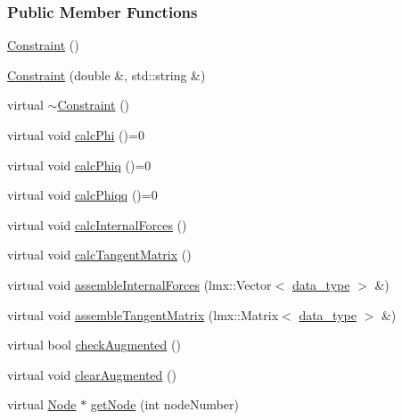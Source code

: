 \subsubsection*{Public Member Functions}
\begin{DoxyCompactItemize}
\item 
\hyperlink{classmknix_1_1_constraint_ae4a69ed64d7746a7f8e2d23f04bc6de6}{Constraint} ()
\item 
\hyperlink{classmknix_1_1_constraint_a093b4ffce363485f60ba251356ff88d1}{Constraint} (double \&, std\-::string \&)
\item 
virtual \hyperlink{classmknix_1_1_constraint_a84cbe5af8074dc229f583d119bbde3e1}{$\sim$\-Constraint} ()
\item 
virtual void \hyperlink{classmknix_1_1_constraint_a7f2b34d256d5eec54b34b0440b562ec1}{calc\-Phi} ()=0
\item 
virtual void \hyperlink{classmknix_1_1_constraint_ab129143960df2b9459e274275608bcf2}{calc\-Phiq} ()=0
\item 
virtual void \hyperlink{classmknix_1_1_constraint_a73ff21573b5e9c4acda789bd5ac46ea8}{calc\-Phiqq} ()=0
\item 
virtual void \hyperlink{classmknix_1_1_constraint_a00ea21a19168bc3cfd3ba97c6a2be31d}{calc\-Internal\-Forces} ()
\item 
virtual void \hyperlink{classmknix_1_1_constraint_a9b7594c65aa792ffb56d3a598996a969}{calc\-Tangent\-Matrix} ()
\item 
virtual void \hyperlink{classmknix_1_1_constraint_aca5d35f6ecd8f8f3852c150c7901b890}{assemble\-Internal\-Forces} (lmx\-::\-Vector$<$ \hyperlink{namespacemknix_a16be4b246fbf2cceb141e3a179111020}{data\-\_\-type} $>$ \&)
\item 
virtual void \hyperlink{classmknix_1_1_constraint_ac376643d6d73cb3b591ba80aae9f7166}{assemble\-Tangent\-Matrix} (lmx\-::\-Matrix$<$ \hyperlink{namespacemknix_a16be4b246fbf2cceb141e3a179111020}{data\-\_\-type} $>$ \&)
\item 
virtual bool \hyperlink{classmknix_1_1_constraint_a26923b449734b9f11ed5ca2556585dcb}{check\-Augmented} ()
\item 
virtual void \hyperlink{classmknix_1_1_constraint_a2e1f0de7e983151fb892468774dcdf12}{clear\-Augmented} ()
\item 
virtual \hyperlink{classmknix_1_1_node}{Node} $\ast$ \hyperlink{classmknix_1_1_constraint_a0e81d924dad26b7b5b0749d4580dd63c}{get\-Node} (int node\-Number)
\end{DoxyCompactItemize}
